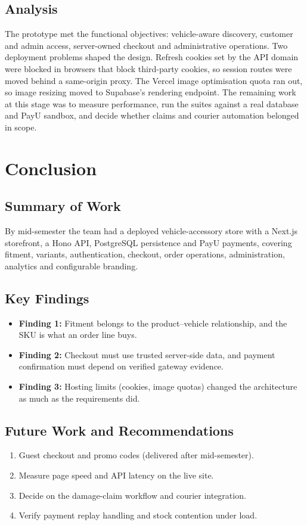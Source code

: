 \documentclass{tietreport}
\begin{document}
\section{Analysis}

The prototype met the functional objectives: vehicle-aware discovery,
customer and admin access, server-owned checkout and administrative
operations. Two deployment problems shaped the design. Refresh cookies set by
the API domain were blocked in browsers that block third-party cookies, so
session routes were moved behind a same-origin proxy. The Vercel image
optimisation quota ran out, so image resizing moved to Supabase's rendering
endpoint. The remaining work at this stage was to measure performance, run
the suites against a real database and PayU sandbox, and decide whether
claims and courier automation belonged in scope.

\chapter{Conclusion}

\section{Summary of Work}
By mid-semester the team had a deployed vehicle-accessory store with a
Next.js storefront, a Hono API, PostgreSQL persistence and PayU payments,
covering fitment, variants, authentication, checkout, order operations,
administration, analytics and configurable branding.

\section{Key Findings}
\begin{itemize}
  \item \textbf{Finding 1:} Fitment belongs to the product--vehicle
        relationship, and the SKU is what an order line buys.
  \item \textbf{Finding 2:} Checkout must use trusted server-side data, and
        payment confirmation must depend on verified gateway evidence.
  \item \textbf{Finding 3:} Hosting limits (cookies, image quotas) changed the
        architecture as much as the requirements did.
\end{itemize}

\section{Future Work and Recommendations}
\begin{enumerate}
  \item Guest checkout and promo codes (delivered after mid-semester).
  \item Measure page speed and API latency on the live site.
  \item Decide on the damage-claim workflow and courier integration.
  \item Verify payment replay handling and stock contention under load.
\end{enumerate}
\end{document}
